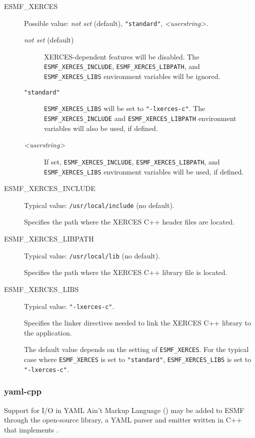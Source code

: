 \begin{description}

\item[ESMF\_XERCES] Possible value: {\it not set} (default), {\tt "standard"}, 
{\it <userstring>}.

\begin{description}
\item[{\it not set} (default)] XERCES-dependent features will be disabled.
The {\tt ESMF\_XERCES\_INCLUDE}, {\tt ESMF\_XERCES\_LIBPATH}, and
{\tt ESMF\_XERCES\_LIBS} environment variables will be ignored.

\item[{\tt "standard"}] {\tt ESMF\_XERCES\_LIBS} will be set to 
{\tt "-lxerces-c"}.  The {\tt ESMF\_XERCES\_INCLUDE} and 
{\tt ESMF\_XERCES\_LIBPATH} environment variables will also be used, 
if defined.

\item[{\it <userstring>}] If set, {\tt ESMF\_XERCES\_INCLUDE}, 
{\tt ESMF\_XERCES\_LIBPATH}, and {\tt ESMF\_XERCES\_LIBS} environment 
variables will be used, if defined.
\end{description}

\item[ESMF\_XERCES\_INCLUDE] Typical value: {\tt /usr/local/include} 
(no default).

Specifies the path where the XERCES C++ header files are located.

\item[ESMF\_XERCES\_LIBPATH] Typical value: {\tt /usr/local/lib} (no default).

Specifies the path where the XERCES C++ library file is located.

\item[ESMF\_XERCES\_LIBS] Typical value: {\tt "-lxerces-c"}.

Specifies the linker directives needed to link the XERCES C++ library to
the application.

The default value depends on the setting of {\tt ESMF\_XERCES}.  For the
typical case where {\tt ESMF\_XERCES} is set to {\tt "standard"}, 
{\tt ESMF\_XERCES\_LIBS} is set to {\tt "-lxerces-c"}. 
\end{description}


\subsubsection{yaml-cpp}
\label{sec:yaml-cpp}
Support for I/O in YAML Ain't Markup Language
()
may be added to ESMF through the open-source
 library,
a YAML parser and emitter written in C++ that implements
.

